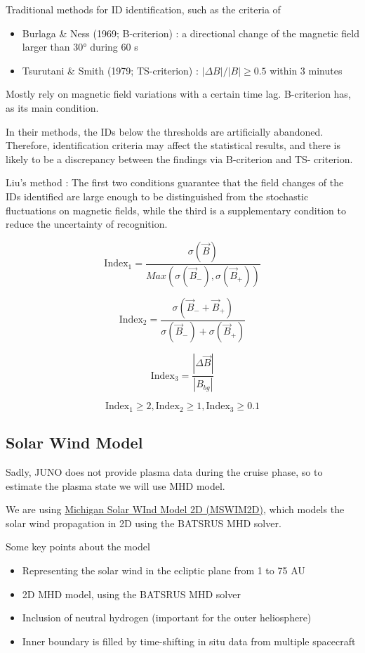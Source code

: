 \documentclass[
]{agujournal2019}
\providecommand{\tightlist}{%
  \setlength{\itemsep}{0pt}\setlength{\parskip}{0pt}}\usepackage{longtable,booktabs,array}
\begin{document}
Traditional methods for ID identiﬁcation, such as the criteria of

\begin{itemize}
\tightlist
\item
  Burlaga \& Ness (1969; B-criterion) : a directional change of the magnetic ﬁeld larger than 30° during 60 s
\item
  Tsurutani \& Smith (1979; TS-criterion) : \(|ΔB|/|B| \geq 0.5\) within 3 minutes
\end{itemize}

Mostly rely on magnetic ﬁeld variations with a certain time lag. B-criterion has, as its main condition.

In their methods, the IDs below the thresholds are artiﬁcially abandoned. Therefore, identiﬁcation criteria may affect the statistical results, and there is likely to be a discrepancy between the ﬁndings via B-criterion and TS- criterion.

Liu's method : The first two conditions guarantee that the field changes of the IDs identiﬁed are large enough to be distinguished from the stochastic fluctuations on magnetic fields, while the third is a supplementary condition to reduce the uncertainty of recognition.

\[ 
\textrm{Index}_1 = \frac{\sigma(\vec{B})}{Max(\sigma(\vec{B}_-),\sigma(\vec{B}_+))} 
\]

\[
\textrm{Index}_2 = \frac{\sigma(\vec{B}_- + \vec{B}_+)} {\sigma(\vec{B}_-) + \sigma(\vec{B}_+)}
\]

\[
\textrm{Index}_3 = \frac{| \Delta \vec{B} |}{|B_{bg}|}
\]

\[ 
\textrm{Index}_1 \ge 2, \textrm{Index}_2 \ge 1, \textrm{Index}_3 \ge 0.1 
\]

\subsection{Solar Wind Model}\label{solar-wind-model}

Sadly, JUNO does not provide plasma data during the cruise phase, so to estimate the plasma state we will use MHD model.

We are using \href{http://csem.engin.umich.edu/MSWIM2D/}{Michigan Solar WInd Model 2D (MSWIM2D)}, which models the solar wind propagation in 2D using the BATSRUS MHD solver. \citet{keeblerMSWIM2DTwodimensionalOuter2022}

Some key points about the model

\begin{itemize}
\tightlist
\item
  Representing the solar wind in the ecliptic plane from 1 to 75 AU
\item
  2D MHD model, using the BATSRUS MHD solver
\item
  Inclusion of neutral hydrogen (important for the outer heliosphere)
\item
  Inner boundary is filled by time-shifting in situ data from multiple spacecraft
\end{itemize}
\end{document}
